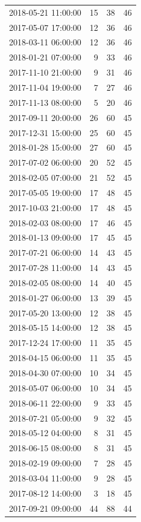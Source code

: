 \begin{tabular}{lrrr}
2018-05-21 11:00:00 & 15 & 38 & 46 \\
2017-05-07 17:00:00 & 12 & 36 & 46 \\
2018-03-11 06:00:00 & 12 & 36 & 46 \\
2018-01-21 07:00:00 & 9 & 33 & 46 \\
2017-11-10 21:00:00 & 9 & 31 & 46 \\
2017-11-04 19:00:00 & 7 & 27 & 46 \\
2017-11-13 08:00:00 & 5 & 20 & 46 \\
2017-09-11 20:00:00 & 26 & 60 & 45 \\
2017-12-31 15:00:00 & 25 & 60 & 45 \\
2018-01-28 15:00:00 & 27 & 60 & 45 \\
2017-07-02 06:00:00 & 20 & 52 & 45 \\
2018-02-05 07:00:00 & 21 & 52 & 45 \\
2017-05-05 19:00:00 & 17 & 48 & 45 \\
2017-10-03 21:00:00 & 17 & 48 & 45 \\
2018-02-03 08:00:00 & 17 & 46 & 45 \\
2018-01-13 09:00:00 & 17 & 45 & 45 \\
2017-07-21 06:00:00 & 14 & 43 & 45 \\
2017-07-28 11:00:00 & 14 & 43 & 45 \\
2018-02-05 08:00:00 & 14 & 40 & 45 \\
2018-01-27 06:00:00 & 13 & 39 & 45 \\
2017-05-20 13:00:00 & 12 & 38 & 45 \\
2018-05-15 14:00:00 & 12 & 38 & 45 \\
2017-12-24 17:00:00 & 11 & 35 & 45 \\
2018-04-15 06:00:00 & 11 & 35 & 45 \\
2018-04-30 07:00:00 & 10 & 34 & 45 \\
2018-05-07 06:00:00 & 10 & 34 & 45 \\
2018-06-11 22:00:00 & 9 & 33 & 45 \\
2018-07-21 05:00:00 & 9 & 32 & 45 \\
2018-05-12 04:00:00 & 8 & 31 & 45 \\
2018-06-15 08:00:00 & 8 & 31 & 45 \\
2018-02-19 09:00:00 & 7 & 28 & 45 \\
2018-03-04 11:00:00 & 9 & 28 & 45 \\
2017-08-12 14:00:00 & 3 & 18 & 45 \\
2017-09-21 09:00:00 & 44 & 88 & 44 \\

\end{tabular}

